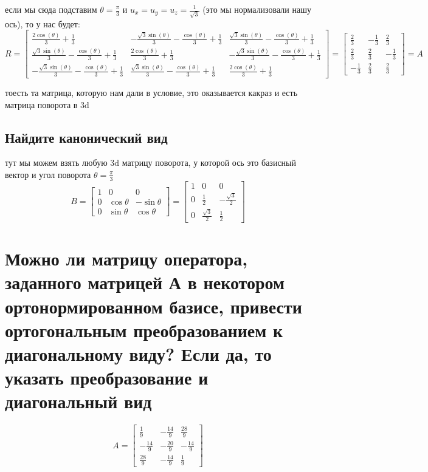 \documentclass{article}
\newcommand{\ds}{\displaystyle}
\renewcommand{\f}{\frac}
\begin{document}
  \noindent
  если мы сюда подставим $\ds \theta = \f{\pi}{3}$ и $\ds u_x = u_y = u_z = \f{1}{\sqrt{3}}$ (это мы нормализовали нашу ось), то у нас будет:
  $$ R = \left[\begin{matrix}\frac{2 \cos{\left(\theta \right)}}{3} + \frac{1}{3} & - \frac{\sqrt{3} \sin{\left(\theta \right)}}{3} - \frac{\cos{\left(\theta \right)}}{3} + \frac{1}{3} & \frac{\sqrt{3} \sin{\left(\theta \right)}}{3} - \frac{\cos{\left(\theta \right)}}{3} + \frac{1}{3}\\\frac{\sqrt{3} \sin{\left(\theta \right)}}{3} - \frac{\cos{\left(\theta \right)}}{3} + \frac{1}{3} & \frac{2 \cos{\left(\theta \right)}}{3} + \frac{1}{3} & - \frac{\sqrt{3} \sin{\left(\theta \right)}}{3} - \frac{\cos{\left(\theta \right)}}{3} + \frac{1}{3}\\- \frac{\sqrt{3} \sin{\left(\theta \right)}}{3} - \frac{\cos{\left(\theta \right)}}{3} + \frac{1}{3} & \frac{\sqrt{3} \sin{\left(\theta \right)}}{3} - \frac{\cos{\left(\theta \right)}}{3} + \frac{1}{3} & \frac{2 \cos{\left(\theta \right)}}{3} + \frac{1}{3}\end{matrix}\right] =
  \left[\begin{matrix}\frac{2}{3} & - \frac{1}{3} & \frac{2}{3}\\\frac{2}{3} & \frac{2}{3} & - \frac{1}{3}\\- \frac{1}{3} & \frac{2}{3} & \frac{2}{3}\end{matrix}\right] = A
  $$

  \noindent
  тоесть та матрица, которую нам дали в условие, это оказывается какраз и есть матрица поворота в 3d

  \subsection{Найдите канонический вид}
  тут мы можем взять любую 3d матрицу поворота, у которой ось это базисный вектор и угол поворота $\ds\theta=\f{\pi}{3}$
  $$ B = \begin{bmatrix}1&0&0\\0&\cos\theta&-\sin\theta\\0&\sin\theta&\cos\theta\end{bmatrix} = \begin{bmatrix}1&0&0\\0&\f{1}{2}&-\f{\sqrt{3}}{2}\\0&\f{\sqrt{3}}{2}&\f{1}{2}\end{bmatrix}$$

  \section{Можно ли матрицу оператора, заданного матрицей А в некотором ортонормированном базисе, привести ортогональным преобразованием к диагональному виду? Если да, то указать преобразование и диагональный вид}
  $$ A = \begin{bmatrix}\f{1}{9}&-\f{14}{9}&\f{28}{9}\\-\f{14}{9}&-\f{20}{9}&-\f{14}{9}\\\f{28}{9}&-\f{14}{9}&\f{1}{9}\end{bmatrix} $$
\end{document}
